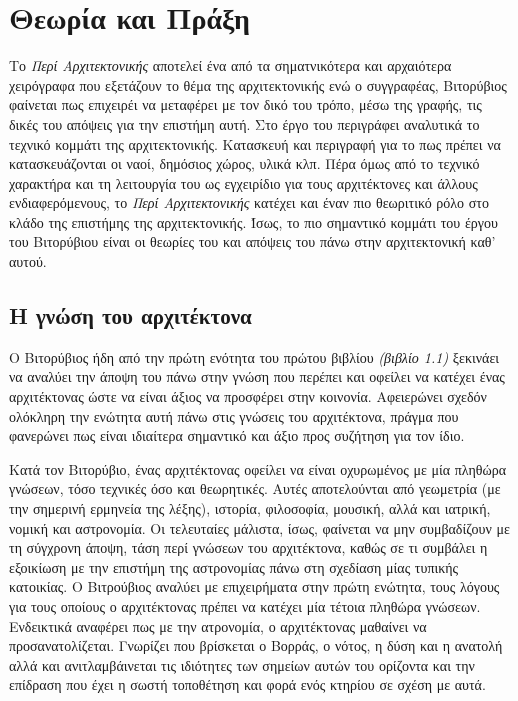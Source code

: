 \section{Θεωρία και Πράξη}

Το \emph{Περί Αρχιτεκτονικής} αποτελεί ένα από τα σηματνικότερα και αρχαιότερα χειρόγραφα που εξετάζουν το θέμα της αρχιτεκτονικής ενώ ο συγγραφέας, Βιτορύβιος φαίνεται πως επιχειρέι να μεταφέρει με τον δικό του τρόπο, μέσω της γραφής, τις δικές του απόψεις για την επιστήμη αυτή. Στο έργο του περιγράφει αναλυτικά το τεχνικό κομμάτι της αρχιτεκτονικής. Κατασκευή και περιγραφή για το πως πρέπει να κατασκευάζονται οι ναοί, δημόσιος χώρος, υλικά κλπ. Πέρα όμως από το τεχνικό χαρακτήρα και τη λειτουργία του ως εγχειρίδιο για τους αρχιτέκτονες και άλλους ενδιαφερόμενους, το \emph{Περί Αρχιτεκτονικής} κατέχει και έναν πιο θεωριτικό ρόλο στο κλάδο της επιστήμης της αρχιτεκτονικής. Ίσως, το πιο σημαντικό κομμάτι του έργου του Βιτορύβιου είναι οι θεωρίες του και απόψεις του πάνω στην αρχιτεκτονική καθ' αυτού. 

\subsection{Η γνώση του αρχιτέκτονα}

Ο Βιτορύβιος ήδη από την πρώτη ενότητα του πρώτου βιβλίου \emph{(βιβλίο 1.1)} ξεκινάει να αναλύει την άποψη του πάνω στην γνώση που περέπει και οφείλει να κατέχει ένας αρχιτέκτονας ώστε να είναι άξιος να προσφέρει στην κοινονία. Αφειερώνει σχεδόν ολόκληρη την ενώτητα αυτή πάνω στις γνώσεις του αρχιτέκτονα, πράγμα που φανερώνει πως είναι ιδιαίτερα σημαντικό και άξιο προς συζήτηση για τον ίδιο.

Κατά τον Βιτορύβιο, ένας αρχιτέκτονας οφείλει να είναι οχυρωμένος με μία πληθώρα γνώσεων, τόσο τεχνικές όσο και θεωρητικές. Αυτές αποτελούνται από γεωμετρία (με την σημερινή ερμηνεία της λέξης), ιστορία, φιλοσοφία, μουσική, αλλά και ιατρική, νομική και αστρονομία. \cite[σ. 392]{masterson_status_2004} Οι τελευταίες μάλιστα, ίσως, φαίνεται να μην συμβαδίζουν με τη σύγχρονη άποψη, τάση περί γνώσεων του αρχιτέκτονα, καθώς σε τι συμβάλει η εξοικίωση με την επιστήμη της αστρονομίας πάνω στη σχεδίαση μίας τυπικής κατοικίας. Ο Βιτρούβιος αναλύει με επιχειρήματα στην πρώτη ενώτητα, τους λόγους για τους οποίους ο αρχιτέκτονας πρέπει να κατέχει μία τέτοια πληθώρα γνώσεων. Ενδεικτικά αναφέρει πως με την ατρονομία, ο αρχιτέκτονας μαθαίνει να προσανατολίζεται. Γνωρίζει που βρίσκεται ο Βορράς, ο νότος, η δύση και η ανατολή αλλά και ανιτλαμβάινεται τις ιδιότητες των σημείων αυτών του ορίζοντα και την επίδραση που έχει η σωστή τοποθέτηση και φορά ενός κτηρίου σε σχέση με αυτά. \cite[σ. 43]{vitruvius-lefas}

